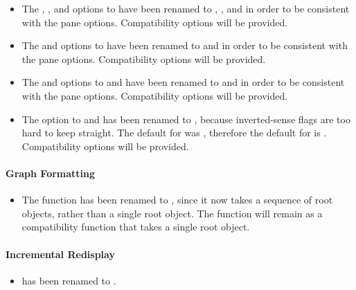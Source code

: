 \begin{itemize}
\item The , , and
 options to 
have been renamed to , , and
 in order to be consistent with the pane
options.  Compatibility options will be provided.

\item The  and  options to
 have been renamed to  and 
in order to be consistent with the pane options.  Compatibility options will be
provided.

\item The  and  options to
 and  have been renamed to
 and  in order to be consistent with the pane
options.  Compatibility options will be provided.

\item The  option to  and
 has been renamed to , because
inverted-sense flags are too hard to keep straight.  The default for
 was , therefore the default for
 is .  Compatibility options will be
provided.
\end{itemize}


\paragraph {Graph Formatting}

\begin{itemize}
\item The function  has been renamed to
, since it now takes a sequence of root objects,
rather than a single root object.  The function  will
remain as a compatibility function that takes a single root object.
\end{itemize}


\paragraph {Incremental Redisplay}

\begin{itemize}
\item {} has been renamed to .
\end{itemize}


